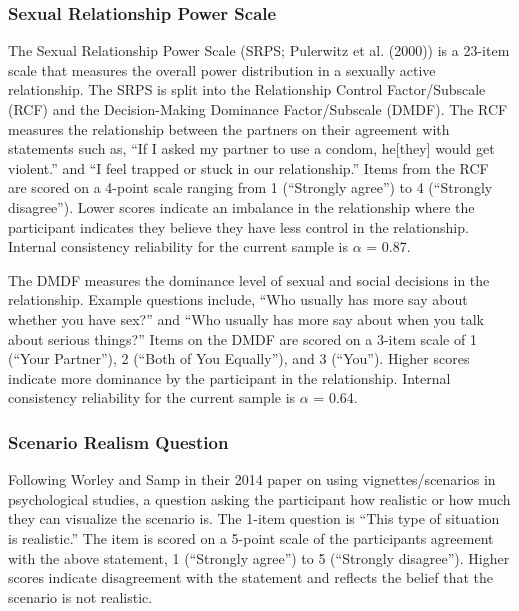 \documentclass[
  english,
  a4paper,floatsintext]{apa7}
\begin{document}
\hypertarget{sexual-relationship-power-scale}{%
\subsubsection{Sexual Relationship Power Scale}\label{sexual-relationship-power-scale}}

The Sexual Relationship Power Scale (SRPS; Pulerwitz et al. (2000)) is a 23-item scale that measures the overall power distribution in a sexually active relationship. The SRPS is split into the Relationship Control Factor/Subscale (RCF) and the Decision-Making Dominance Factor/Subscale (DMDF). The RCF measures the relationship between the partners on their agreement with statements such as, ``If I asked my partner to use a condom, he{[}they{]} would get violent.'' and ``I feel trapped or stuck in our relationship.'' Items from the RCF are scored on a 4-point scale ranging from 1 (``Strongly agree'') to 4 (``Strongly disagree''). Lower scores indicate an imbalance in the relationship where the participant indicates they believe they have less control in the relationship. Internal consistency reliability for the current sample is \(\alpha\) = 0.87.

The DMDF measures the dominance level of sexual and social decisions in the relationship. Example questions include, ``Who usually has more say about whether you have sex?'' and ``Who usually has more say about when you talk about serious things?'' Items on the DMDF are scored on a 3-item scale of 1 (``Your Partner''), 2 (``Both of You Equally''), and 3 (``You''). Higher scores indicate more dominance by the participant in the relationship. Internal consistency reliability for the current sample is \(\alpha\) = 0.64.

\hypertarget{scenario-realism-question}{%
\subsubsection{Scenario Realism Question}\label{scenario-realism-question}}

Following Worley and Samp in their 2014 paper on using vignettes/scenarios in psychological studies, a question asking the participant how realistic or how much they can visualize the scenario is. The 1-item question is ``This type of situation is realistic.'' The item is scored on a 5-point scale of the participants agreement with the above statement, 1 (``Strongly agree'') to 5 (``Strongly disagree''). Higher scores indicate disagreement with the statement and reflects the belief that the scenario is not realistic.
\end{document}
